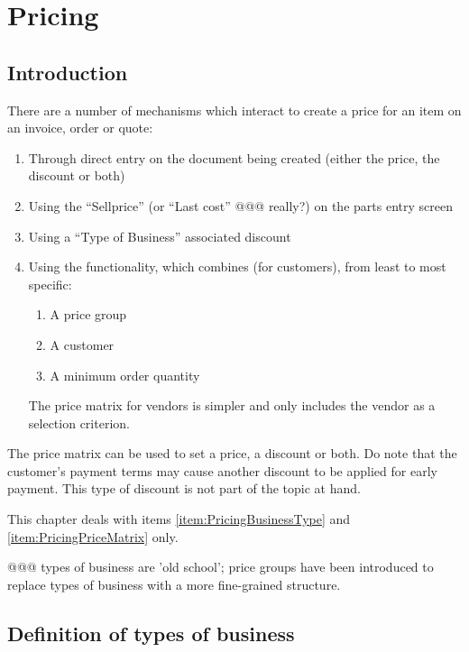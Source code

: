 \chapter{Pricing}
\label{cha-pricing}

\section{Introduction}
\label{sec-pricing-introduction}

There are a number of mechanisms which interact to create a price for an item
on an invoice, order or quote:

\begin{enumerate}
	\item Through direct entry on the document being created (either the price, the discount or both)
	\item Using the ``Sellprice'' (or ``Last cost'' @@@ really?) on the parts entry screen
	\item Using a ``Type of Business'' associated discount
	\item Using the  functionality, which combines (for customers), from least to most specific:
		\begin{enumerate}
			\item A price group
			\item A customer
			\item A minimum order quantity
		\end{enumerate}
		The price matrix for vendors is simpler and only includes the vendor as a selection criterion.
\end{enumerate}

The price matrix can be used to set a price, a discount or both.  Do note that the \gls{customer}'s payment
terms may cause another discount to be applied for early payment.  This type of discount is not part of the
topic at hand. 

This chapter deals with items \ref{item:PricingBusinessType} and \ref{item:PricingPriceMatrix} only.

@@@ types of business are 'old school'; price groups have been introduced to replace types of business with a more fine-grained structure.

\section{Definition of types of business}
\label{sec-pricing-business-types}

